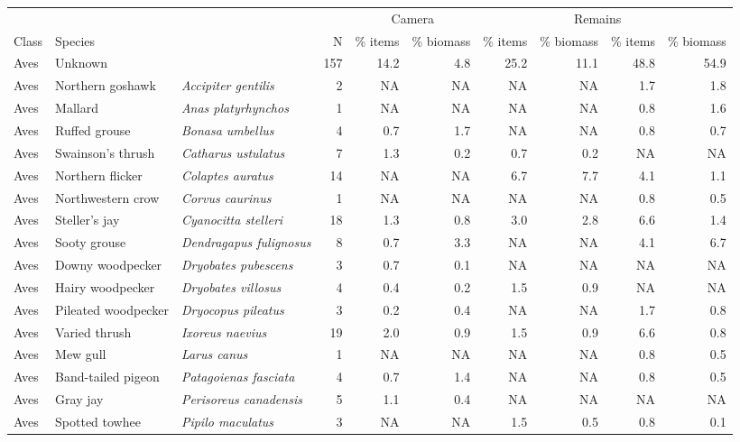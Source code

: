\documentclass[
]{article}
\begin{document}
\begin{table}[H]
\centering
\begin{tabular}{l|l|>{\em}l|r|r|r|r|r|r|r}
\hline
\multicolumn{4}{c|}{ } & \multicolumn{2}{c|}{Camera} & \multicolumn{2}{c|}{Pellets} & \multicolumn{2}{c}{Remains} \\
\cline{5-6} \cline{7-8} \cline{9-10}
Class & Species &   & N & \% items & \% biomass & \% items & \% biomass & \% items & \% biomass\\
\hline
Aves & Unknown &  & 157 & 14.2 & 4.8 & 25.2 & 11.1 & 48.8 & 54.9\\
\hline
Aves & Northern goshawk & Accipiter gentilis & 2 & NA & NA & NA & NA & 1.7 & 1.8\\
\hline
Aves & Mallard & Anas platyrhynchos & 1 & NA & NA & NA & NA & 0.8 & 1.6\\
\hline
Aves & Ruffed grouse & Bonasa umbellus & 4 & 0.7 & 1.7 & NA & NA & 0.8 & 0.7\\
\hline
Aves & Swainson's thrush & Catharus ustulatus & 7 & 1.3 & 0.2 & 0.7 & 0.2 & NA & NA\\
\hline
Aves & Northern flicker & Colaptes auratus & 14 & NA & NA & 6.7 & 7.7 & 4.1 & 1.1\\
\hline
Aves & Northwestern crow & Corvus caurinus & 1 & NA & NA & NA & NA & 0.8 & 0.5\\
\hline
Aves & Steller's jay & Cyanocitta stelleri & 18 & 1.3 & 0.8 & 3.0 & 2.8 & 6.6 & 1.4\\
\hline
Aves & Sooty grouse & Dendragapus fulignosus & 8 & 0.7 & 3.3 & NA & NA & 4.1 & 6.7\\
\hline
Aves & Downy woodpecker & Dryobates pubescens & 3 & 0.7 & 0.1 & NA & NA & NA & NA\\
\hline
Aves & Hairy woodpecker & Dryobates villosus & 4 & 0.4 & 0.2 & 1.5 & 0.9 & NA & NA\\
\hline
Aves & Pileated woodpecker & Dryocopus pileatus & 3 & 0.2 & 0.4 & NA & NA & 1.7 & 0.8\\
\hline
Aves & Varied thrush & Ixoreus naevius & 19 & 2.0 & 0.9 & 1.5 & 0.9 & 6.6 & 0.8\\
\hline
Aves & Mew gull & Larus canus & 1 & NA & NA & NA & NA & 0.8 & 0.5\\
\hline
Aves & Band-tailed pigeon & Patagoienas fasciata & 4 & 0.7 & 1.4 & NA & NA & 0.8 & 0.5\\
\hline
Aves & Gray jay & Perisoreus canadensis & 5 & 1.1 & 0.4 & NA & NA & NA & NA\\
\hline
Aves & Spotted towhee & Pipilo maculatus & 3 & NA & NA & 1.5 & 0.5 & 0.8 & 0.1\\

\end{tabular}
\end{table}
\end{document}
